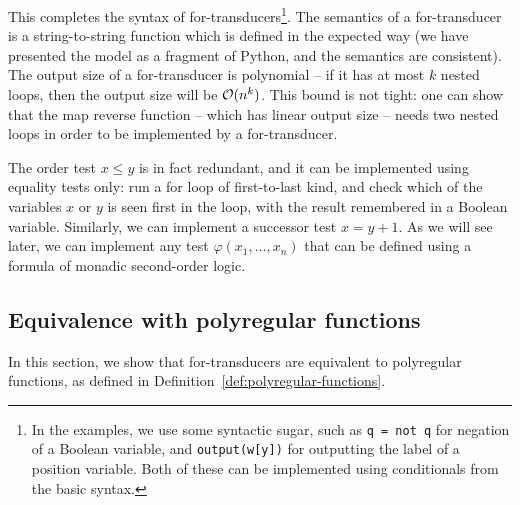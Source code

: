 This completes the syntax of for-transducers\footnote{
  In the examples, we use some syntactic sugar, such as \texttt{q = not q} for negation of a Boolean variable, and \texttt{output(w[y])} for outputting the label of a position variable. Both of these can be implemented using conditionals from the basic syntax.
}.  The semantics of a for-transducer is a string-to-string function which is defined in the expected way (we have presented the model as a fragment of Python, and the semantics are consistent).
The output size of a for-transducer is polynomial -- if it has at most $k$ nested loops, then the output size will be ${\mathcal O}(n^k)$. This bound is not tight: one can show that the map reverse function -- which has linear output size -- needs two nested loops in order to be implemented by a for-transducer. 

\begin{myexample}
  The order test  $x \le y$ is in fact redundant, and it  can be implemented using equality tests only: run  a for loop of first-to-last kind, and check which of the variables $x$ or $y$ is seen  first in the loop, with the result remembered  in a Boolean variable. Similarly, we can implement a successor test $x = y+1$. As we will see later, we can implement any test $\varphi(x_1,\ldots,x_n)$ that can be defined using a formula of monadic second-order logic.
\end{myexample}

\subsection{Equivalence with polyregular functions}
\label{sec:for-transducers-equivalence}
In this section, we show that for-transducers are equivalent to polyregular functions, as defined in Definition~\ref{def:polyregular-functions}. 

